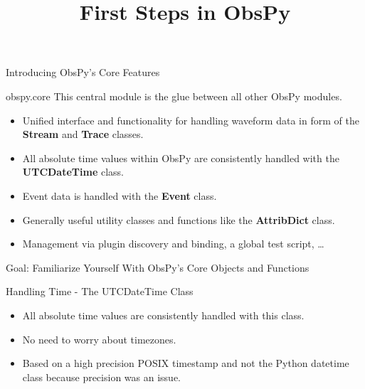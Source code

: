 
\title{First Steps in ObsPy}


\frame[plain]{\titlepage}

\begin{frame}{}
    \begin{center}
        \textcolor{lmu@darkgreen}{\LARGE{Introducing ObsPy's Core Features}}
    \end{center}
\end{frame}

\begin{frame}{obspy.core}
This central module is the glue between all other ObsPy modules.

    \begin{itemize}
        \item Unified interface and functionality for handling waveform data in
            form of the \textbf{Stream} and \textbf{Trace} classes.
        \item All absolute time values within ObsPy are consistently handled
            with the \textbf{UTCDateTime} class.
        \item Event data is handled with the \textbf{Event} class.
        \item Generally useful utility classes and functions like the
            \textbf{AttribDict} class.
        \item Management via plugin discovery and binding, a global test
            script, \ldots
    \end{itemize}
\end{frame}


\begin{frame}{}
    \begin{center}
        \textcolor{lmu@darkgreen}{\LARGE{Goal: Familiarize Yourself With ObsPy's Core Objects and Functions}}
    \end{center}
\end{frame}


\begin{frame}{Handling Time - The UTCDateTime Class}
    \begin{itemize}
        \item All absolute time values are consistently handled with this class.
        \item No need to worry about timezones.
        \item Based on a high precision POSIX timestamp and not the Python datetime class because precision was an issue.
    \end{itemize}
\end{frame}


